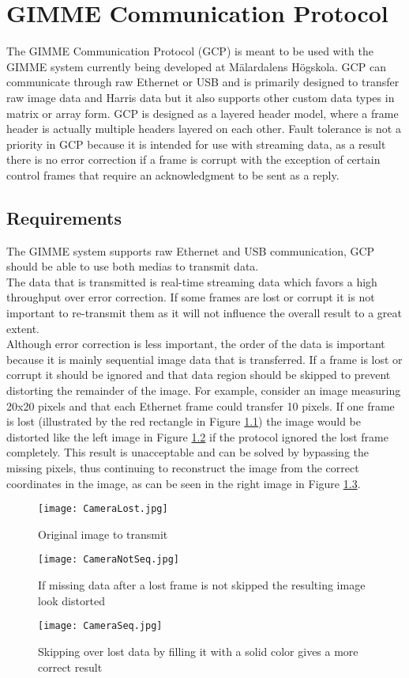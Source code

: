 \chapter{GIMME Communication Protocol}
The GIMME Communication Protocol (GCP) is meant to be used with the GIMME system currently being developed at Mälardalens Högskola. GCP can communicate through raw Ethernet or USB and is primarily designed to transfer raw image data and Harris data but it also supports other custom data types in matrix or array form. GCP is designed as a layered header model, where a frame header is actually multiple headers layered on each other. Fault tolerance is not a priority in GCP because it is intended for use with streaming data, as a result there is no error correction if a frame is corrupt with the exception of certain control frames that require an acknowledgment to be sent as a reply.
\section{Requirements}
The GIMME system supports raw Ethernet and USB communication, GCP should be able to use both medias to transmit data.
\\
The data that is transmitted is real-time streaming data which favors a high throughput over error correction. If some frames are lost or corrupt it is not important to re-transmit them as it will not influence the overall result to a great extent.
\\
Although error correction is less important, the order of the data is important because it is mainly sequential image data that is transferred. If a frame is lost or corrupt it should be ignored and that data region should be skipped to prevent distorting the remainder of the image. For example, consider an image measuring 20x20 pixels and that each Ethernet frame could transfer 10 pixels. If one frame is lost (illustrated by the red rectangle in Figure \ref{fig:CameraLost}) the image would be distorted like the left image in Figure \ref{fig:CameraNotSeq} if the protocol ignored the lost frame completely. This result is unacceptable and can be solved by bypassing the missing pixels, thus continuing to reconstruct the image from the correct coordinates in the image, as can be seen in the right image in Figure \ref{fig:CameraSeq}.

\begin{figure}
\centering
\texttt{[image: CameraLost.jpg]}
\caption{Original image to transmit}
\label{fig:CameraLost}
\end{figure}
\begin{figure}
\centering
\texttt{[image: CameraNotSeq.jpg]}
\caption{If missing data after a lost frame is not skipped the resulting image look distorted}
\label{fig:CameraNotSeq}
\end{figure}
\begin{figure}
\centering
\texttt{[image: CameraSeq.jpg]}
\caption{Skipping over lost data by filling it with a solid color gives a more correct result}
\label{fig:CameraSeq}
\end{figure}

